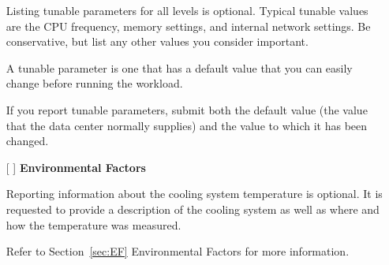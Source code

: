 \begin{itemize}
Listing tunable parameters for all levels is optional.
Typical tunable values are the CPU frequency, memory settings, and internal network settings. Be conservative, but list any other values you consider important.

A tunable parameter is one that has a default value that you can easily change before running the workload.

If you report tunable parameters, submit both the default value (the value that the data center normally supplies) and the value to which it has been changed.

\newpage
\item[{[ ]}]
\textbf{Environmental Factors}

Reporting information about the cooling system temperature is optional.
It is requested to provide a description of the cooling system as well as where and how the temperature was measured.

Refer to Section~\ref{sec:EF} Environmental Factors for more information.

\end{itemize}
